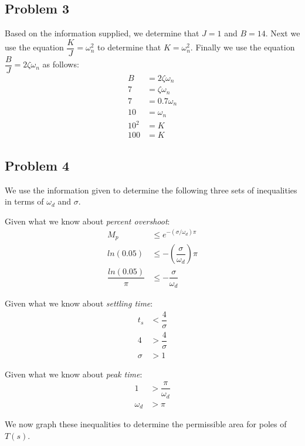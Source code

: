 \documentclass[letterpaper,10pt]{article}
\begin{document}
\subsection*{Problem 3}
Based on the information supplied, we determine that $J = 1$ and $B = 14$.
Next we use the equation $\dfrac{K}{J} = \omega_{n}^{2}$ to determine that $K=\omega_{n}^{2}$.  Finally we use the equation $\dfrac{B}{J}=2\zeta\omega_{n}$ as follows:
\begin{align*}
	B &= 2\zeta\omega_{n} \\
	7 &= \zeta\omega_{n} \\
	7 &= 0.7\omega_{n} \\
	10 &= \omega_{n} \\
	10^2 &= K \\
	100 &= K
\end{align*}

\subsection*{Problem 4}
We use the information given to determine the following three sets of inequalities in terms of $\omega_{d}$ and $\sigma$.

Given what we know about \emph{percent overshoot}:
\begin{align*}
	M_{p} &\leq e^{-(\sigma/\omega_{d})\pi} \\
	ln(0.05) &\leq -\left(\dfrac{\sigma}{\omega_{d}}\right)\pi \\
	\dfrac{ln(0.05)}{\pi} &\leq -\dfrac{\sigma}{\omega_{d}}
\end{align*}

Given what we know about \emph{settling time}:
\begin{align*}
	t_{s} &< \dfrac{4}{\sigma} \\
	4 &> \dfrac{4}{\sigma} \\
	\sigma &> 1
\end{align*}

Given what we know about \emph{peak time}:
\begin{align*}
	1 &> \dfrac{\pi}{\omega_{d}} \\
	\omega_{d} &> \pi
\end{align*}

We now graph these inequalities to determine the permissible area for poles of $T(s)$.
\end{document}

